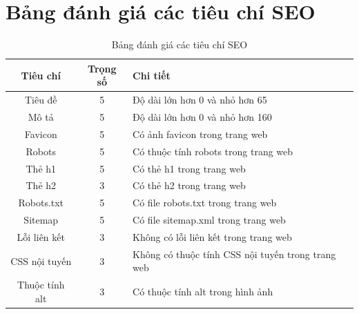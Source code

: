 \section{Bảng đánh giá các tiêu chí SEO}
\begin{table}[!ht]
	\centering
	\begin{tabular}{|c|c|l|}
		\hline
		\textbf{Tiêu chí} & \textbf{Trọng số} & \textbf{Chi tiết}\\
		\hline
		Tiêu đề & 5 & Độ dài lớn hơn 0 và nhỏ hơn 65\\
		\hline
		Mô tả & 5 & Độ dài lớn hơn 0 và nhỏ hơn 160\\
		\hline
		Favicon & 5 & Có ảnh favicon trong trang web\\
		\hline
		Robots & 5 & Có thuộc tính robots trong trang web\\
		\hline
		Thẻ h1 & 5 & Có thẻ h1 trong trang web\\
		\hline
		Thẻ h2 & 3 & Có thẻ h2 trong trang web\\
		\hline
		Robots.txt & 5 & Có file robots.txt trong trang web\\
		\hline
		Sitemap & 5 & Có file sitemap.xml trong trang web\\
		\hline
		Lỗi liên kết & 3 & Không có lỗi liên kết trong trang web\\
		\hline
		CSS nội tuyến & 3 & Không có thuộc tính CSS nội tuyến trong trang web\\
		\hline
		Thuộc tính alt & 3 & Có thuộc tính alt trong hình ảnh\\
		\hline
	\end{tabular}
	\caption{Bảng đánh giá các tiêu chí SEO}
\end{table}